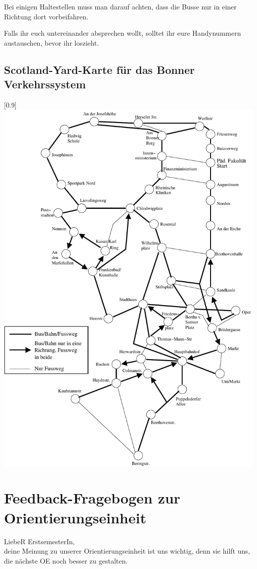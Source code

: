 Bei einigen Haltestellen muss man darauf achten, dass die Busse nur in einer
Richtung dort vorbeifahren.

Falls ihr euch untereinander absprechen wollt, solltet ihr eure Handynummern austauschen, bevor ihr loszieht.

\section*{Scotland-Yard-Karte für das Bonner Verkehrssystem}
\scalebox{0.9}[0.9]{\includegraphics*{karte}}

\chapter{Feedback-Fragebogen zur Orientierungseinheit}
\label{fragebogen}
\medskip
LiebeR ErstsemesterIn,
\medskip
\\
deine Meinung zu unserer Orientierungseinheit ist uns wichtig, denn sie hilft uns, die nächste OE noch besser zu gestalten.

